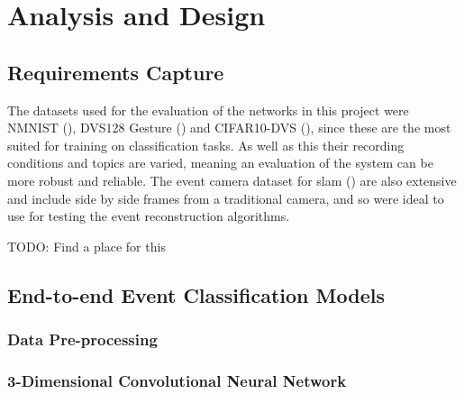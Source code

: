 \chapter{Analysis and Design} \label{chap:analysis_and_design}

\section{Requirements Capture}


The datasets used for the evaluation of the networks in this project were NMNIST (), DVS128 Gesture () and CIFAR10-DVS (), since these are the most suited for training on classification tasks. As well as this their recording conditions and topics are varied, meaning an evaluation of the system can be more robust and reliable. The event camera dataset for slam () are also extensive and include side by side frames from a traditional camera, and so were ideal to use for testing the event reconstruction algorithms.

\color{red} TODO: Find a place for this \color{black}

\section{End-to-end Event Classification Models}

\subsection{Data Pre-processing}

\subsection{3-Dimensional Convolutional Neural Network}

